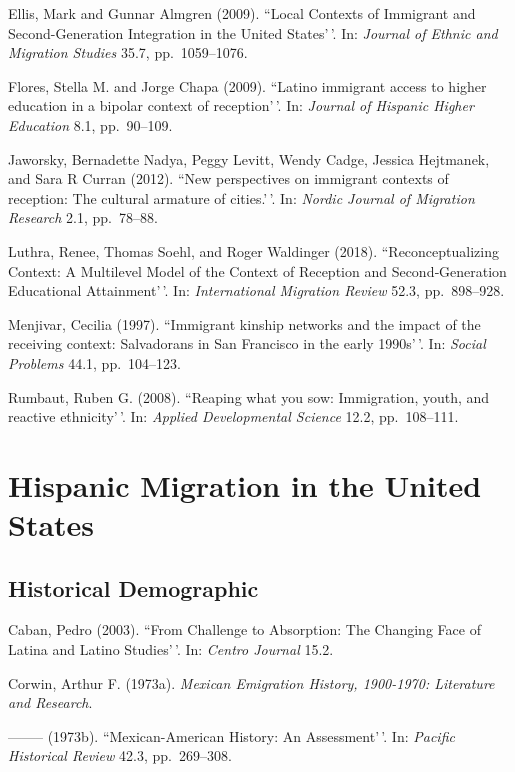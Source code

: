 \documentclass[11pt,]{article}
\begin{document}
Ellis, Mark and Gunnar Almgren (2009). ``Local Contexts of Immigrant and
Second-Generation Integration in the United States'\,'. In:
\emph{Journal of Ethnic and Migration Studies} 35.7, pp.~1059--1076.

Flores, Stella M. and Jorge Chapa (2009). ``Latino immigrant access to
higher education in a bipolar context of reception'\,'. In:
\emph{Journal of Hispanic Higher Education} 8.1, pp.~90--109.

Jaworsky, Bernadette Nadya, Peggy Levitt, Wendy Cadge, Jessica
Hejtmanek, and Sara R Curran (2012). ``New perspectives on immigrant
contexts of reception: The cultural armature of cities.'\,'. In:
\emph{Nordic Journal of Migration Research} 2.1, pp.~78--88.

Luthra, Renee, Thomas Soehl, and Roger Waldinger (2018).
``Reconceptualizing Context: A Multilevel Model of the Context of
Reception and Second‐Generation Educational Attainment'\,'. In:
\emph{International Migration Review} 52.3, pp.~898--928.

Menjivar, Cecilia (1997). ``Immigrant kinship networks and the impact of
the receiving context: Salvadorans in San Francisco in the early
1990s'\,'. In: \emph{Social Problems} 44.1, pp.~104--123.

Rumbaut, Ruben G. (2008). ``Reaping what you sow: Immigration, youth,
and reactive ethnicity'\,'. In: \emph{Applied Developmental Science}
12.2, pp.~108--111.

\hypertarget{hispanic-migration-in-the-united-states}{%
\section{Hispanic Migration in the United
States}\label{hispanic-migration-in-the-united-states}}

\hypertarget{historical-demographic}{%
\subsection{Historical Demographic}\label{historical-demographic}}

Caban, Pedro (2003). ``From Challenge to Absorption: The Changing Face
of Latina and Latino Studies'\,'. In: \emph{Centro Journal} 15.2.

Corwin, Arthur F. (1973a).
\emph{Mexican Emigration History, 1900-1970: Literature and Research}.

-------- (1973b). ``Mexican-American History: An Assessment'\,'. In:
\emph{Pacific Historical Review} 42.3, pp.~269--308.
\end{document}
